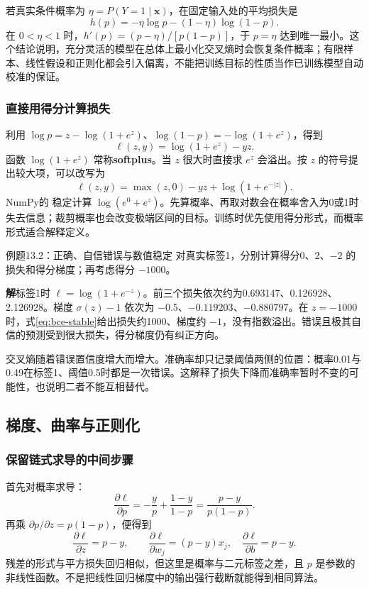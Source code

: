 \documentclass[UTF8,fontset=none,zihao=-4,a4paper]{ctexart}
\newcommand{\term}[1]{\textbf{#1}}
\newcommand{\sol}{\par\noindent\textbf{解}\quad}
\newcommand{\code}[1]{\texttt{\detokenize{#1}}}
\numberwithin{equation}{section}
\numberwithin{figure}{section}
\begin{document}
若真实条件概率为 $\eta=P(Y=1\mid\symbf{x})$，在固定输入处的平均损失是
\[
 h(p)=-\eta\log p-(1-\eta)\log(1-p).
\]
在 $0<\eta<1$ 时，$h'(p)=(p-\eta)/[p(1-p)]$，于 $p=\eta$ 达到唯一最小。这个结论说明，充分灵活的模型在总体上最小化交叉熵时会恢复条件概率；有限样本、线性假设和正则化都会引入偏离，不能把训练目标的性质当作已训练模型自动校准的保证。

\subsubsection{直接用得分计算损失}
利用 $\log p=z-\log(1+e^z)$、$\log(1-p)=-\log(1+e^z)$，得到
\begin{equation}
 \ell(z,y)=\log(1+e^z)-yz.
\end{equation}
函数 $\log(1+e^z)$ 常称\term{softplus}。当 $z$ 很大时直接求 $e^z$ 会溢出。按 $z$ 的符号提出较大项，可以改写为
\begin{equation}
 \ell(z,y)=\max(z,0)-yz+\log(1+e^{-|z|}).\label{eq:bce-stable}
\end{equation}
NumPy的 \code{np.logaddexp(0,z)} 稳定计算 $\log(e^0+e^z)$。先算概率、再取对数会在概率舍入为0或1时失去信息；裁剪概率也会改变极端区间的目标。训练时优先使用得分形式，而概率形式适合解释定义。

\begin{infobox}[unbreakable]{例题13.2：正确、自信错误与数值稳定}
对真实标签1，分别计算得分0、2、$-2$ 的损失和得分梯度；再考虑得分 $-1000$。
\sol 标签1时 $\ell=\log(1+e^{-z})$。前三个损失依次约为0.693147、0.126928、2.126928。梯度 $\sigma(z)-1$ 依次为 $-0.5$、$-0.119203$、$-0.880797$。在 $z=-1000$ 时，式\eqref{eq:bce-stable}给出损失约1000、梯度约 $-1$，没有指数溢出。错误且极其自信的预测受到很大损失，得分梯度仍有纠正方向。
\end{infobox}
交叉熵随着错误置信度增大而增大。准确率却只记录阈值两侧的位置：概率0.01与0.49在标签1、阈值0.5时都是一次错误。这解释了损失下降而准确率暂时不变的可能性，也说明二者不能互相替代。

\subsection{梯度、曲率与正则化}
\subsubsection{保留链式求导的中间步骤}
首先对概率求导：
\[
 \frac{\partial\ell}{\partial p}=-\frac y p+\frac{1-y}{1-p}
 =\frac{p-y}{p(1-p)}.
\]
再乘 $\partial p/\partial z=p(1-p)$，便得到
\[
 \frac{\partial\ell}{\partial z}=p-y,\qquad
 \frac{\partial\ell}{\partial w_j}=(p-y)x_j,\quad
 \frac{\partial\ell}{\partial b}=p-y.
\]
残差的形式与平方损失回归相似，但这里是概率与二元标签之差，且 $p$ 是参数的非线性函数。不是把线性回归梯度中的输出强行截断就能得到相同算法。
\end{document}
